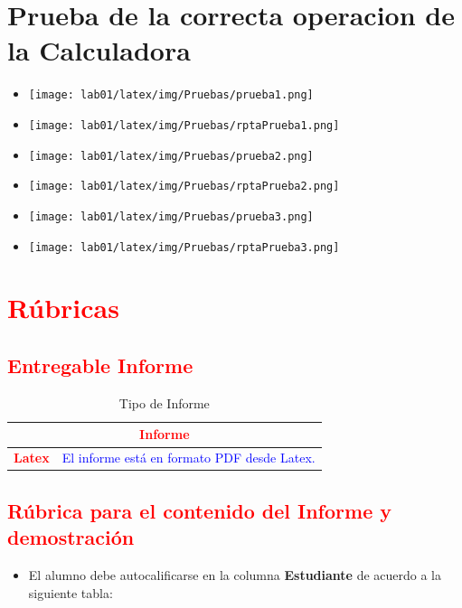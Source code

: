 \documentclass{article}
\begin{document}
        \section{Prueba de la correcta operacion de la Calculadora}
            \begin{itemize}
                \centering
                \item [] \texttt{[image: lab01/latex/img/Pruebas/prueba1.png]}
                \item [] \texttt{[image: lab01/latex/img/Pruebas/rptaPrueba1.png]}
                \item [] \texttt{[image: lab01/latex/img/Pruebas/prueba2.png]}
                \item [] \texttt{[image: lab01/latex/img/Pruebas/rptaPrueba2.png]}
                \item [] \texttt{[image: lab01/latex/img/Pruebas/prueba3.png]}
                \item [] \texttt{[image: lab01/latex/img/Pruebas/rptaPrueba3.png]}
                
            \end{itemize}
   		

	\section{\textcolor{red}{Rúbricas}}
	
	\subsection{\textcolor{red}{Entregable Informe}}
	\begin{table}[H]
		\caption{Tipo de Informe}
		\setlength{\tabcolsep}{0.5em} %
		{\renewcommand{\arraystretch}{1.5}%
		\begin{tabular}{|p{3cm}|p{12cm}|}
			\hline
			\multicolumn{2}{|c|}{\textbf{\textcolor{red}{Informe}}}  \\
			\hline 
			\textbf{\textcolor{red}{Latex}} & \textcolor{blue}{El informe está en formato PDF desde Latex.}   \\ 
			\hline 
						
		\end{tabular}
	}
	\end{table}
	
	\clearpage
	
	\subsection{\textcolor{red}{Rúbrica para el contenido del Informe y demostración}}
	\begin{itemize}			

		\item El alumno debe autocalificarse en la columna \textbf{Estudiante} de acuerdo a la siguiente tabla:
	
	\end{itemize}
		
\end{document}
